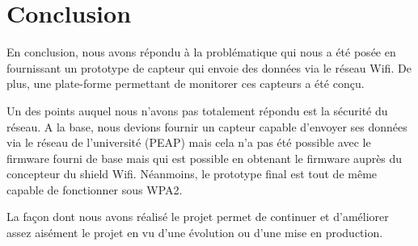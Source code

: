 	\section*{Conclusion}
		\par
		En conclusion, nous avons répondu à la problématique qui nous a été posée en fournissant un prototype de capteur qui envoie des données via le réseau Wifi. De plus, une plate-forme permettant de monitorer ces capteurs a été conçu.
		\par
		Un des points auquel nous n'avons pas totalement répondu est la sécurité du réseau. A la base, nous devions fournir un capteur capable d'envoyer ses données via le réseau de l'université (PEAP) mais cela n'a pas été possible avec le firmware fourni de base mais qui est possible en obtenant le firmware auprès du concepteur du shield Wifi. Néanmoins, le prototype final est tout de même capable de fonctionner sous WPA2.
		\par
		La façon dont nous avons réalisé le projet permet de continuer et d'améliorer assez aisément le projet en vu d'une évolution ou d'une mise en production.
